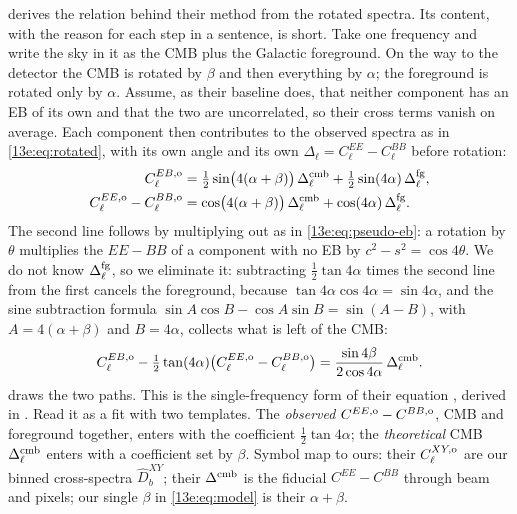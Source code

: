  derives the relation behind their method from the rotated spectra. Its content, with the reason
for each step in a sentence, is short. Take one frequency and write the sky
in it as the CMB plus the Galactic foreground. On the way to the detector the CMB is rotated by $\beta$ and then
everything by $\alpha$; the foreground is rotated only by $\alpha$. Assume, as their baseline does, that
neither component has an EB of its own and that the two are uncorrelated, so their cross terms vanish on
average. Each component then contributes to the observed spectra as in \eqref{13e:eq:rotated}, with its own
angle and its own $\Delta_\ell=C^{EE}_\ell-C^{BB}_\ell$ before rotation:
\begin{equation}
  \begin{aligned}
  C^{EB,{\rm o}}_\ell&=\tfrac12\sin\bigl(4(\alpha+\beta)\bigr)\,\Delta^{\rm cmb}_\ell+\tfrac12\sin(4\alpha)\,\Delta^{\rm fg}_\ell ,\\
  C^{EE,{\rm o}}_\ell-C^{BB,{\rm o}}_\ell&=\cos\bigl(4(\alpha+\beta)\bigr)\,\Delta^{\rm cmb}_\ell+\cos(4\alpha)\,\Delta^{\rm fg}_\ell .
  \end{aligned}
  \label{13e:eq:two-comp}
\end{equation}
The second line follows by multiplying out as in \eqref{13e:eq:pseudo-eb}: a rotation by $\theta$ multiplies the
$EE-BB$ of a component with no EB by $c^2-s^2=\cos4\theta$. We do not know $\Delta^{\rm fg}_\ell$, so we
eliminate it: subtracting $\tfrac12\tan4\alpha$ times the second line from the first cancels the foreground,
because $\tan4\alpha\cos4\alpha=\sin4\alpha$, and the sine subtraction formula
$\sin A\cos B-\cos A\sin B=\sin(A-B)$, with $A=4(\alpha+\beta)$ and $B=4\alpha$, collects what is left of the CMB:
\begin{equation}
  C^{EB,{\rm o}}_\ell-\tfrac12\tan(4\alpha)\bigl(C^{EE,{\rm o}}_\ell-C^{BB,{\rm o}}_\ell\bigr)
  =\frac{\sin4\beta}{2\cos4\alpha}\,\Delta^{\rm cmb}_\ell .
  \label{13e:eq:mk}
\end{equation}
 draws the two paths. This is the single-frequency form of their equation \cite[(2)]{MinamiKomatsu2020}, derived in
\cite{Minami2019}. Read it as a fit with two templates. The \emph{observed} $C^{EE,{\rm o}}-C^{BB,{\rm o}}$, CMB
and foreground together, enters with the coefficient $\tfrac12\tan4\alpha$; the \emph{theoretical} CMB
$\Delta^{\rm cmb}_\ell$ enters with a coefficient set by $\beta$. Symbol map to ours: their $C^{XY,{\rm o}}_\ell$ are our
binned cross-spectra $\widehat D^{XY}_b$; their $\Delta^{\rm cmb}$ is the fiducial $C^{EE}-C^{BB}$ through beam and pixels;
our single $\beta$ in \eqref{13e:eq:model} is their $\alpha+\beta$.

